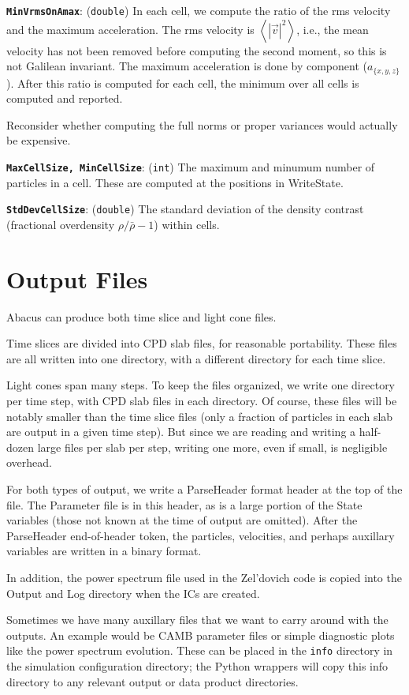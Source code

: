\documentclass[11pt,preprint]{aastex}
\newcommand{\param}[2]{\medskip\noindent\textbf{\texttt{#1}}: ({\tt #2}) }
\newcommand{\todo}{}
\newcommand{\todo}[1]{{\bf TODO: #1}}
\begin{document}
\param{MinVrmsOnAmax}{double}
In each cell, we compute the ratio of the rms velocity and the
maximum acceleration.  The rms velocity is $\left<|\vec{v}|^2\right>$,
i.e., the mean velocity has not been removed before computing the
second moment, so this is not Galilean invariant.  The maximum
acceleration is done by component ($a_{\{x,y,z\}}$).  After this
ratio is computed for each cell, the minimum over all cells is
computed and reported.

\todo{Reconsider whether computing the full norms or proper variances 
would actually be expensive.}

\param{MaxCellSize, MinCellSize}{int} The maximum and minumum number
of particles in a cell.  These are computed at the positions in
WriteState.

\param{StdDevCellSize}{double} The standard deviation of the density contrast (fractional overdensity $\rho/\bar\rho - 1$) within cells.


\clearpage
\section{Output Files}

Abacus can produce both time slice and light cone files.  

Time slices are divided into CPD slab files, for reasonable
portability.  These files are all written into one directory, with
a different directory for each time slice.

Light cones span many steps.  To keep the files organized, we write
one directory per time step, with CPD slab files in each directory.
Of course, these files will be notably smaller than the time slice
files (only a fraction of particles in each slab are output in a
given time step).  But since we are reading and writing a half-dozen
large files per slab per step, writing one more, even if small, is
negligible overhead.

For both types of output, we write a ParseHeader format header at
the top of the file.  The Parameter file is in this header, as is
a large portion of the State variables (those not known at the time
of output are omitted).  After the ParseHeader end-of-header token,
the particles, velocities, and perhaps auxillary variables are written
in a binary format.

In addition, the power spectrum file used in the Zel'dovich code
is copied into the Output and Log directory when the ICs are created.

Sometimes we have many auxillary files that we want to carry around
with the outputs.  An example would be CAMB parameter files or simple
diagnostic plots like the power spectrum evolution.  These can be placed
in the \verb|info| directory in the simulation configuration directory;
the Python wrappers will copy this info directory to any relevant
output or data product directories.
\end{document}
